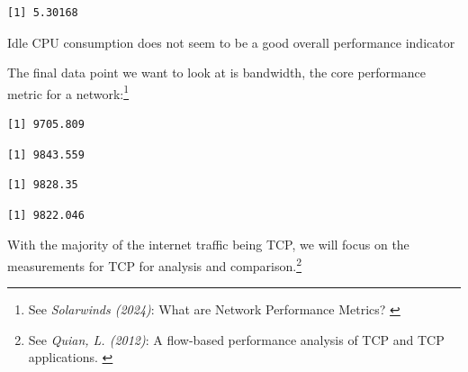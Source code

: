 \begin{verbatim}
[1] 5.30168
\end{verbatim}

Idle CPU consumption does not seem to be a good overall performance indicator

The final data point we want to look at is bandwidth, the core
performance metric for a network:\footnote{See \textit{Solarwinds (2024)}: What are Network Performance Metrics? \cite{networkPerformance}}

\begin{Shaded}
\begin{Highlighting}[]
\SpecialCharTok{\$}
\end{Highlighting}
\end{Shaded}

\begin{verbatim}
[1] 9705.809
\end{verbatim}

\begin{Shaded}
\begin{Highlighting}[]
\SpecialCharTok{\$}
\end{Highlighting}
\end{Shaded}

\begin{verbatim}
[1] 9843.559
\end{verbatim}

\begin{Shaded}
\begin{Highlighting}[]
\SpecialCharTok{\$}
\end{Highlighting}
\end{Shaded}

\begin{verbatim}
[1] 9828.35
\end{verbatim}

\begin{Shaded}
\begin{Highlighting}[]
\SpecialCharTok{\$}
\end{Highlighting}
\end{Shaded}

\begin{verbatim}
[1] 9822.046
\end{verbatim}

With the majority of the internet traffic being TCP, we will focus on
the measurements for TCP for analysis and comparison.\footnote{See \textit{Quian, L. (2012)}: A flow-based performance analysis of TCP and TCP applications. \cite{tcpTraffic}}

